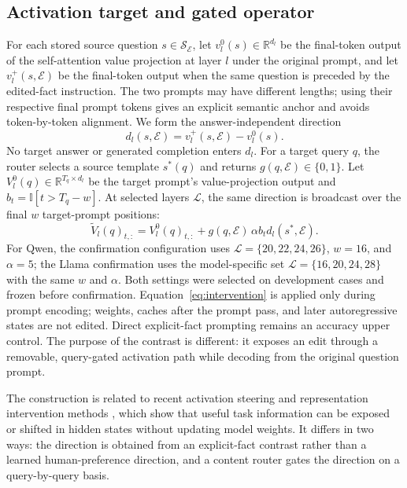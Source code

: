 \documentclass{article}
\begin{document}
\subsection{Activation target and gated operator}
For each stored source question $s\in\mathcal{S}_{\mathcal E}$, let $v_l^0(s)\in\mathbb{R}^{d_l}$ be the final-token output of the self-attention value projection at layer $l$ under the original prompt, and let $v_l^+(s,\mathcal{E})$ be the final-token output when the same question is preceded by the edited-fact instruction. The two prompts may have different lengths; using their respective final prompt tokens gives an explicit semantic anchor and avoids token-by-token alignment. We form the answer-independent direction
\begin{equation}
    d_l(s,\mathcal{E})=v_l^+(s,\mathcal{E})-v_l^0(s).
\end{equation}
No target answer or generated completion enters $d_l$. For a target query $q$, the router selects a source template $s^*(q)$ and returns $g(q,\mathcal{E})\in\{0,1\}$. Let $V_l^0(q)\in\mathbb{R}^{T_q\times d_l}$ be the target prompt's value-projection output and $b_t=\mathbb{I}[t>T_q-w]$. At selected layers $\mathcal{L}$, the same direction is broadcast over the final $w$ target-prompt positions:
\begin{equation}
    \widetilde V_l(q)_{t,:}=V_l^0(q)_{t,:}
    +g(q,\mathcal{E})\,\alpha b_t d_l(s^*,\mathcal{E}).
    \label{eq:intervention}
\end{equation}
For Qwen, the confirmation configuration uses $\mathcal{L}=\{20,22,24,26\}$, $w=16$, and $\alpha=5$; the Llama confirmation uses the model-specific set $\mathcal{L}=\{16,20,24,28\}$ with the same $w$ and $\alpha$. Both settings were selected on development cases and frozen before confirmation. Equation~\ref{eq:intervention} is applied only during prompt encoding; weights, caches after the prompt pass, and later autoregressive states are not edited. Direct explicit-fact prompting remains an accuracy upper control. The purpose of the contrast is different: it exposes an edit through a removable, query-gated activation path while decoding from the original question prompt.

The construction is related to recent activation steering and representation intervention methods \cite{turner2023activation,li2023iti,todd2024functionvectors,burns2023latentknowledge}, which show that useful task information can be exposed or shifted in hidden states without updating model weights. It differs in two ways: the direction is obtained from an explicit-fact contrast rather than a learned human-preference direction, and a content router gates the direction on a query-by-query basis.
\end{document}
